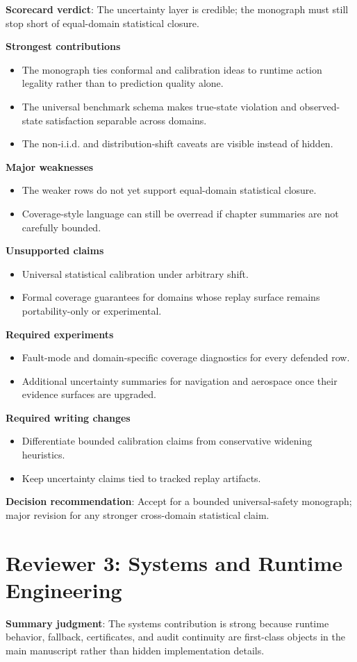 \textbf{Scorecard verdict}: The uncertainty layer is credible; the monograph must still stop short of equal-domain statistical closure.

\textbf{Strongest contributions}
\begin{itemize}
\item The monograph ties conformal and calibration ideas to runtime action legality rather than to prediction quality alone.
\item The universal benchmark schema makes true-state violation and observed-state satisfaction separable across domains.
\item The non-i.i.d. and distribution-shift caveats are visible instead of hidden.
\end{itemize}
\textbf{Major weaknesses}
\begin{itemize}
\item The weaker rows do not yet support equal-domain statistical closure.
\item Coverage-style language can still be overread if chapter summaries are not carefully bounded.
\end{itemize}
\textbf{Unsupported claims}
\begin{itemize}
\item Universal statistical calibration under arbitrary shift.
\item Formal coverage guarantees for domains whose replay surface remains portability-only or experimental.
\end{itemize}
\textbf{Required experiments}
\begin{itemize}
\item Fault-mode and domain-specific coverage diagnostics for every defended row.
\item Additional uncertainty summaries for navigation and aerospace once their evidence surfaces are upgraded.
\end{itemize}
\textbf{Required writing changes}
\begin{itemize}
\item Differentiate bounded calibration claims from conservative widening heuristics.
\item Keep uncertainty claims tied to tracked replay artifacts.
\end{itemize}
\textbf{Decision recommendation}: Accept for a bounded universal-safety monograph; major revision for any stronger cross-domain statistical claim.

\section{Reviewer 3: Systems and Runtime Engineering}
\textbf{Summary judgment}: The systems contribution is strong because runtime behavior, fallback, certificates, and audit continuity are first-class objects in the main manuscript rather than hidden implementation details.

